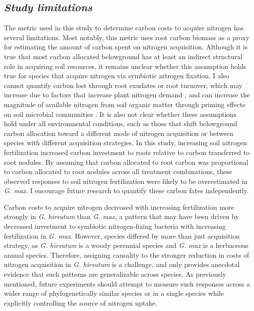 \subsection{\textit{Study limitations}}
\noindent The metric used in this study to determine carbon costs to acquire nitrogen has several limitations. Most notably, this metric uses root carbon biomass as a proxy for estimating the amount of carbon spent on nitrogen acquisition. Although it is true that most carbon allocated belowground has at least an indirect structural role in acquiring soil resources, it remains unclear whether this assumption holds true for species that acquire nitrogen via symbiotic nitrogen fixation. I also cannot quantify carbon lost through root exudates or root turnover, which may increase due to factors that increase plant nitrogen demand , and can increase the magnitude of available nitrogen from soil organic matter through priming effects on soil microbial communities . It is also not clear whether these assumptions hold under all environmental conditions, such as those that shift belowground carbon allocation toward a different mode of nitrogen acquisition  or between species with different acquisition strategies. In this study, increasing soil nitrogen fertilization increased carbon investment to roots relative to carbon transferred to root nodules. By assuming that carbon allocated to root carbon was proportional to carbon allocated to root nodules across all treatment combinations, these observed responses to soil nitrogen fertilization were likely to be overestimated in \textit{G. max}. I encourage future research to quantify these carbon fates independently.

Carbon costs to acquire nitrogen decreased with increasing fertilization more strongly in \textit{G. hirsutum} than \textit{G. max}, a pattern that may have been driven by decreased investment to symbiotic nitrogen-fixing bacteria with increasing fertilization in \textit{G. max}. However, species differed by more than just acquisition strategy, as \textit{G. hirsutum} is a woody perennial species and \textit{G. max} is a herbaceous annual species. Therefore, assigning causality to the stronger reduction in costs of nitrogen acquisition in \textit{G. hirsutum} is a challenge, and only provides anecdotal evidence that such patterns are generalizable across species. As previously mentioned, future experiments should attempt to measure such responses across a wider range of phylogenetically similar species or in a single species while explicitly controlling the source of nitrogen uptake.

